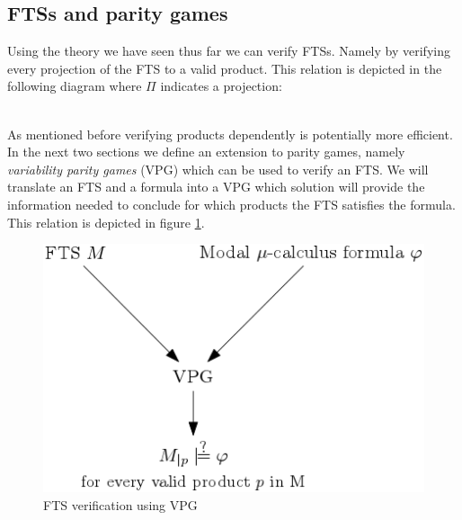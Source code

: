\subsection{FTSs and parity games}
Using the theory we have seen thus far we can verify FTSs. Namely by verifying every projection of the FTS to a valid product. This relation is depicted in the following diagram where $\Pi$ indicates a projection:
\\\\
As mentioned before verifying products dependently is potentially more efficient. In the next two sections we define an extension to parity games, namely \textit{variability parity games} (VPG) which can be used to verify an FTS. We will translate an FTS and a formula into a VPG which solution will provide the information needed to conclude for which products the FTS satisfies the formula. This relation is depicted in figure \ref{fig:ftsverificationusingvpg}.
\begin{figure}[h]
	\centering
	\includegraphics[scale=0.5]{Diagrams/FTSVerificationUsingVPG}
	\caption[FTS verification using VPG]{FTS verification using VPG}
	\label{fig:ftsverificationusingvpg}
\end{figure}
